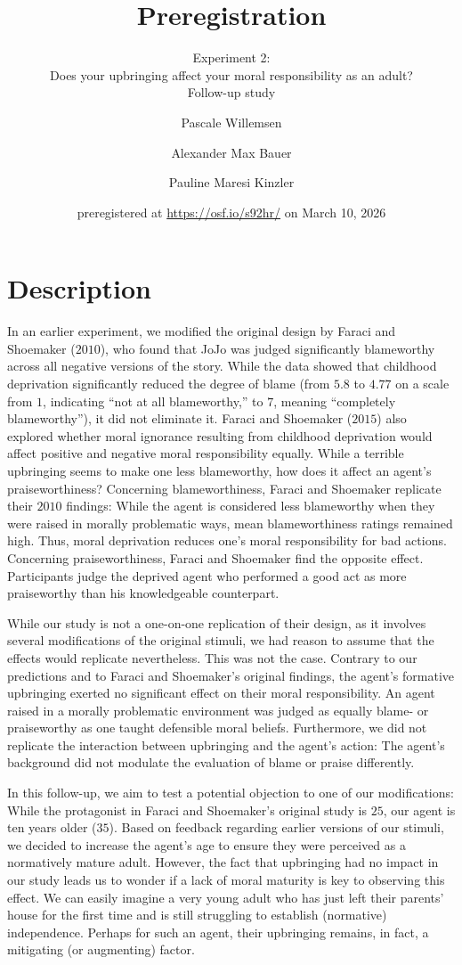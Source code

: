 \documentclass[scrarticle]{scrartcl}
\title{Preregistration}
\subtitle{Experiment 2:\\Does your upbringing affect your moral responsibility as an adult?\\Follow-up study}
\author[1]{Pascale Willemsen}
\author[2]{Alexander Max Bauer}
\author[1]{Pauline Maresi Kinzler }
\affil[1]{ University of Zurich}
\affil[2]{ Carl von Ossietzky University of Oldenburg}
\date{\small preregistered at \url{https://osf.io/s92hr/} on March 10, 2026}
\begin{document}
\maketitle


\clearpage
\section{Description}
In an earlier experiment, we modified the original design by Faraci and Shoemaker ($2010$), who found that JoJo was judged significantly blameworthy across all negative versions of the story.
While the data showed that childhood deprivation significantly reduced the degree of blame (from $5.8$ to $4.77$ on a scale from $1$, indicating \enquote{not at all blameworthy,} to $7$, meaning \enquote{completely blameworthy}), it did not eliminate it.
Faraci and Shoemaker ($2015$) also explored whether moral ignorance resulting from childhood deprivation would affect positive and negative moral responsibility equally.
While a terrible upbringing seems to make one less blameworthy, how does it affect an agent's praiseworthiness?
Concerning blameworthiness, Faraci and Shoemaker replicate their $2010$ findings:
While the agent is considered less blameworthy when they were raised in morally problematic ways, mean blameworthiness ratings remained high.
Thus, moral deprivation reduces one's moral responsibility for bad actions.
Concerning praiseworthiness, Faraci and Shoemaker find the opposite effect.
Participants judge the deprived agent who performed a good act as more praiseworthy than his knowledgeable counterpart.

While our study is not a one-on-one replication of their design, as it involves several modifications of the original stimuli, we had reason to assume that the effects would replicate nevertheless.
This was not the case.
Contrary to our predictions and to Faraci and Shoemaker's original findings, the agent's formative upbringing exerted no significant effect on their moral responsibility.
An agent raised in a morally problematic environment was judged as equally blame- or praiseworthy as one taught defensible moral beliefs.
Furthermore, we did not replicate the interaction between upbringing and the agent's action:
The agent's background did not modulate the evaluation of blame or praise differently.

In this follow-up, we aim to test a potential objection to one of our modifications:
While the protagonist in Faraci and Shoemaker's original study is $25$, our agent is ten years older ($35$).
Based on feedback regarding earlier versions of our stimuli, we decided to increase the agent's age to ensure they were perceived as a normatively mature adult.
However, the fact that upbringing had no impact in our study leads us to wonder if a lack of moral maturity is key to observing this effect.
We can easily imagine a very young adult who has just left their parents' house for the first time and is still struggling to establish (normative) independence.
Perhaps for such an agent, their upbringing remains, in fact, a mitigating (or augmenting) factor.
\end{document}
